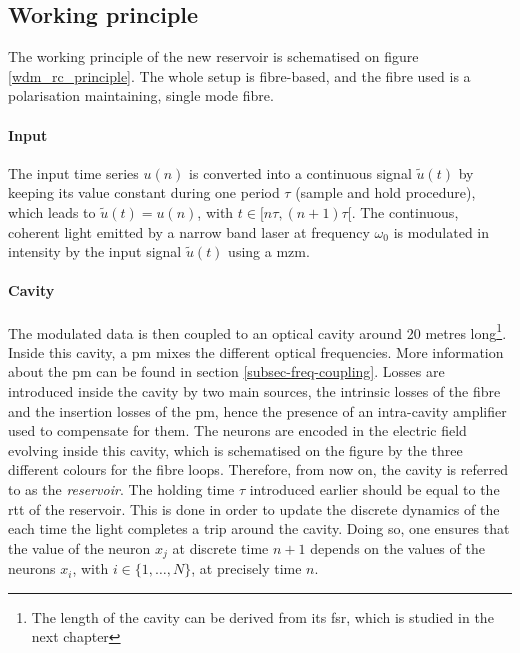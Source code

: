 
\subsection{Working principle}

The working principle of the new reservoir is schematised on figure \ref{wdm_rc_principle}. The whole setup is fibre-based, and the fibre used is a polarisation maintaining, single mode fibre. 

\paragraph{Input}

The input time series $u(n)$ is converted into a continuous signal $\tilde{u}(t)$ by keeping its value constant during one period $\tau$ (sample and hold procedure), which leads to $\tilde{u}(t)=u(n)$, with $t \in [n\tau, (n+1)\tau[$. The continuous, coherent light emitted by a narrow band laser at frequency $\omega_0$ is modulated in intensity by the input signal $\tilde{u}(t)$ using a \gls{mzm}.  

\paragraph{Cavity}

The modulated data is then coupled to an optical cavity around 20 metres long\footnote{The length of the cavity can be derived from its \gls{fsr}, which is studied in the next chapter}. Inside this cavity, a \gls{pm} mixes the different optical frequencies. More information about the \gls{pm} can be found in section \ref{subsec-freq-coupling}. Losses are introduced inside the cavity by two main sources, the intrinsic losses of the fibre and the insertion losses of the \gls{pm}, hence the presence of an intra-cavity amplifier used to compensate for them. The neurons are encoded in the electric field evolving inside this cavity, which is schematised on the figure by the three different colours for the fibre loops. Therefore, from now on, the cavity is referred to as the \textit{reservoir}. The holding time $\tau$ introduced earlier should be equal to the \gls{rtt} of the reservoir. This is done in order to update the discrete dynamics of the \rcer each time the light completes a trip around the cavity. Doing so, one ensures that the value of the neuron $x_j$ at discrete time $n+1$ depends on the values of the neurons $x_i$, with $i \in \{1,\dots, N\}$, at precisely time $n$. 

